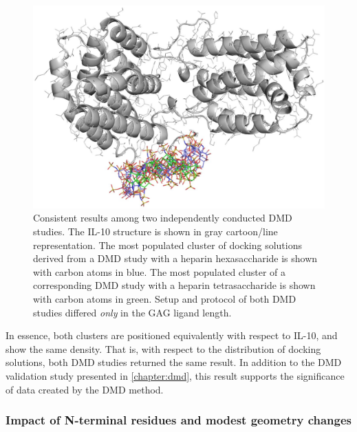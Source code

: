 \begin{figure}
\centering
\includegraphics[width=1.0\textwidth]{gfx/dmdil10/hp_hexa_vs_tetra_clusters_position_match_cropped.jpg}
\caption[]{Consistent results among two independently conducted DMD studies. The
IL-10 structure is shown in gray cartoon/line representation. The most populated
cluster of docking solutions derived from a DMD study with a heparin
hexasaccharide is shown with carbon atoms in blue. The most populated cluster of
a corresponding DMD study with a heparin tetrasaccharide is shown with carbon
atoms in green. Setup and protocol of both DMD studies differed \textit{only} in
the GAG ligand length.}
\label{fig:dmdil10:hp_hexa_vs_tetra_clusters_position_match}
\end{figure}

In essence, both clusters are positioned equivalently with respect to IL-10, and
show the same density. That is, with respect to the distribution of docking
solutions, both DMD studies returned the same result. In addition to the DMD
validation study presented in \cref{chapter:dmd}, this result supports the
significance of data created by the DMD method.


\subsubsection{Impact of N-terminal residues and modest geometry changes}

